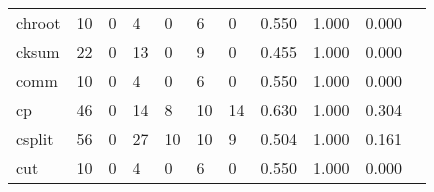\begin{longtable}{lp{1.2cm}p{1.2cm}p{1.2cm}p{1.2cm}p{1.2cm}p{1.2cm}p{1.2cm}p{1.2cm}p{1.2cm}p{1.2cm}}
chroot    &                                    10 &                                                  0 &                                                  4 &                                                  0 &                                                  6 &                                                  0 &                                              0.550 &                                              1.000 &                                              0.000 \\
cksum     &                                    22 &                                                  0 &                                                 13 &                                                  0 &                                                  9 &                                                  0 &                                              0.455 &                                              1.000 &                                              0.000 \\
comm      &                                    10 &                                                  0 &                                                  4 &                                                  0 &                                                  6 &                                                  0 &                                              0.550 &                                              1.000 &                                              0.000 \\
cp        &                                    46 &                                                  0 &                                                 14 &                                                  8 &                                                 10 &                                                 14 &                                              0.630 &                                              1.000 &                                              0.304 \\
csplit    &                                    56 &                                                  0 &                                                 27 &                                                 10 &                                                 10 &                                                  9 &                                              0.504 &                                              1.000 &                                              0.161 \\
cut       &                                    10 &                                                  0 &                                                  4 &                                                  0 &                                                  6 &                                                  0 &                                              0.550 &                                              1.000 &                                              0.000 \\

\end{longtable}
